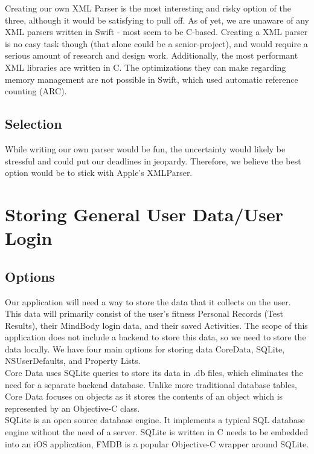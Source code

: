 \documentclass[letterpaper,10pt,titlepage]{article}
\begin{document}
Creating our own XML Parser is the most interesting and risky option of the three, although it would be satisfying to pull off. As of yet, we are unaware of any XML parsers written in Swift - most seem to be C-based. Creating a XML parser is no easy task though (that alone could be a senior-project), and would require a serious amount of research and design work. Additionally, the most performant XML libraries are written in C. The optimizations they can make regarding memory management are not possible in Swift, which used automatic reference counting (ARC).\\

\subsection{Selection}
While writing our own parser would be fun, the uncertainty would likely be stressful and could put our deadlines in jeopardy. Therefore, we believe the best option would be to stick with Apple's XMLParser.\\


\section{Storing General User Data/User Login}

\subsection{Options}

Our application will need a way to store the data that it collects on the user. This data will primarily consist of the user's fitness Personal Records (Test Results), their MindBody login data, and their saved Activities. The scope of this application does not include a backend to store this data, so we need to store the data locally. We have four main options for storing data CoreData, SQLite, NSUserDefaults, and Property Lists.\\

Core Data uses SQLite queries to store its data in .db files, which eliminates the need for a separate backend database. Unlike more traditional database tables, Core Data focuses on objects as it stores the contents of an object which is represented by an Objective-C class.\\

SQLite is an open source database engine. It implements a typical SQL database engine without the need of a server. SQLite is written in C needs to be embedded into an iOS application, FMDB is a popular Objective-C wrapper around SQLite.\cite{dbpara1}\\
\end{document}
